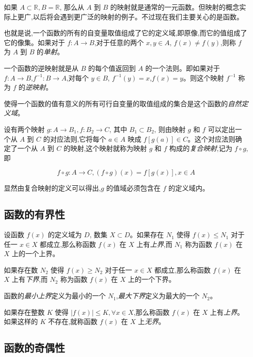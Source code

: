 \documentclass[lang=cn,10pt,twoside]{elegantbook}
\begin{document}
如果 $A \subset \mathbb R, B = \mathbb R$, 那么从 $A$ 到 $B$ 的映射就是通常的一元函数。但映射的概念实际上更广,以后将会遇到更广泛的映射的例子。不过现在我们主要关心的是函数。

也就是说,一个函数的所有的自变量取值组成了它的定义域,即原像,而它的值组成了它的像集。如果对于 $f: A \rightarrow B$,对于任意的两个 $x, y \in A$, $f(x) \neq f(y)$,则称 $f$ 为 $A$ 到 $B$ 的\emph{单射}。

一个函数的逆映射就是从 $B$ 的每个值返回到 $A$ 的一个法则。即如果对于 $f: A \rightarrow B$,$f^{-1}: B \rightarrow A$,对每个 $y \in B$, $f^{-1}(y) = x$,$f(x) = y$。则这个映射 $f^{-1}$ 称为 $f$ 的\emph{逆映射}。

使得一个函数的值有意义的所有可行自变量的取值组成的集合是这个函数的\emph{自然定义域}。

设有两个映射 $g: A \rightarrow B_1, f: B_2 \rightarrow C$, 其中 $B_1 \subset B_2$, 则由映射 $g$ 和 $f$ 可以定出一个从 $A$ 到 $C$ 的对应法则,它将每个 $a \in A$ 映成 $f[g(a)] \in C$。这个对应法则确定了一个从 $A$ 到 $C$ 的映射,这个映射就称为映射 $g$ 和 $f$ 构成的\emph{复合映射},记为 $f\circ g$,即

\begin{equation*}
  f \circ g: A \rightarrow C, (f \circ g)(x) = f[g(x)], x \in A
\end{equation*}

显然由复合映射的定义可以得出,$g$ 的值域必须包含在 $f$ 的定义域内。

\subsection{函数的有界性}

设函数 $f(x)$ 的定义域为 $D$, 数集 $X \subset D$。如果存在 $N_1$ 使得 $f(x) \leq N_1$ 对于任一 $x \in X$ 都成立,那么称函数 $f(x)$ 在 $X$ 上有\emph{上界},而 $N_1$ 称为函数 $f(x)$ 在 $X$ 上的一个上界。

如果存在数 $N_2$ 使得 $f(x) \geq N_2$ 对于任一 $x \in X$ 都成立,那么称函数 $f(x)$ 在 $X$ 上有\emph{下界},而 $N_2$ 称为函数 $f(x)$ 在 $X$ 上的一个下界。

函数的\emph{最小上界}定义为最小的一个 $N_1$,\emph{最大下界}定义为最大的一个 $N_2$。

如果存在整数 $K$ 使得 $|f(x)| \leq K, \forall x \in X$,那么称函数 $f(x)$ 在 $X$ 上有\emph{上界}。如果这样的 $K$ 不存在,就称函数 $f(x)$ 在 $X$ 上\emph{无界}。

\subsection{函数的奇偶性}
\end{document}
